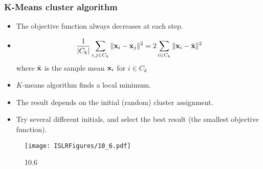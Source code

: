 \documentclass{beamer}
\def\bfx{{\bf x}}
\begin{document}
          
           \begin{frame}
           	\frametitle{K-Means cluster algorithm}
           	\begin{itemize}
           		\item The objective function always decreases at each step.
           		
           		\item $${1 \over |C_k|} \sum_{i, j\in C_k} \|\bfx_i - \bfx_j\|^2
           	 = 2 \sum_{i \in C_k} \|\bfx_i - \bar \bfx\|^2
           	 $$
           	 where $\bar \bfx$ is the sample mean $\bfx_i$ for $i \in C_k$   
      
           		\item $K$-means algorithm finds a local minimum. 
           		
           		\item The result depends on the initial (random) cluster assignment.
           		
           		\item Try several different initials, and select the best result (the smallest 
           		objective function).
           	\end{itemize}
           \end{frame} 	
           
                \begin{frame}
                	 
                	\begin{figure}
                		\centering
                		
                		\centering
                		\texttt{[image: ISLRFigures/10\_6.pdf]}
                		\caption{10.6
                		}
                		
                		
                	\end{figure}
                \end{frame}
                
             
              
\end{document}
